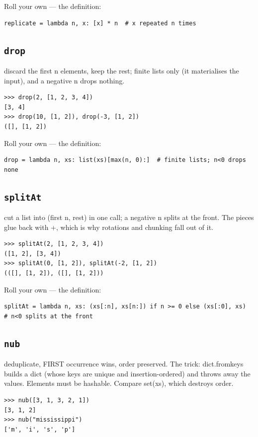 \documentclass[10pt,letterpaper]{book}
\begin{document}
Roll your own --- the definition:

\begin{lstlisting}[style=ex]
replicate = lambda n, x: [x] * n  # x repeated n times
\end{lstlisting}
\subsection{\texttt{drop}}\label{def:drop}
discard the first n elements, keep the rest; finite lists only (it materialises the input), and a negative n drops nothing.
\begin{lstlisting}[style=ex]
>>> drop(2, [1, 2, 3, 4])
[3, 4]
>>> drop(10, [1, 2]), drop(-3, [1, 2])
([], [1, 2])
\end{lstlisting}

Roll your own --- the definition:

\begin{lstlisting}[style=ex]
drop = lambda n, xs: list(xs)[max(n, 0):]  # finite lists; n<0 drops none
\end{lstlisting}
\subsection{\texttt{splitAt}}\label{def:splitAt}
cut a list into (first n, rest) in one call; a negative n splits at the front. The pieces glue back with +, which is why rotations and chunking fall out of it.
\begin{lstlisting}[style=ex]
>>> splitAt(2, [1, 2, 3, 4])
([1, 2], [3, 4])
>>> splitAt(0, [1, 2]), splitAt(-2, [1, 2])
(([], [1, 2]), ([], [1, 2]))
\end{lstlisting}

Roll your own --- the definition:

\begin{lstlisting}[style=ex]
splitAt = lambda n, xs: (xs[:n], xs[n:]) if n >= 0 else (xs[:0], xs)  # n<0 splits at the front
\end{lstlisting}
\subsection{\texttt{nub}}\label{def:nub}
deduplicate, FIRST occurrence wins, order preserved. The trick: dict.fromkeys builds a dict (whose keys are unique and insertion-ordered) and throws away the values. Elements must be hashable. Compare set(xs), which destroys order.
\begin{lstlisting}[style=ex]
>>> nub([3, 1, 3, 2, 1])
[3, 1, 2]
>>> nub("mississippi")
['m', 'i', 's', 'p']
\end{lstlisting}
\end{document}
